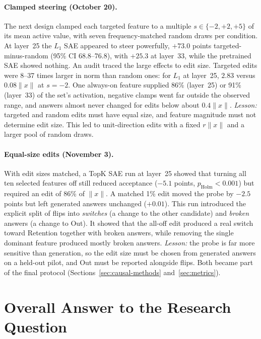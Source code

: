 \paragraph{Clamped steering (October 20).} The next design clamped each
targeted feature to a multiple $s\in\{-2,+2,+5\}$ of its mean active value,
with seven frequency-matched random draws per condition. At layer~25 the $L_1$
SAE appeared to steer powerfully, $+73.0$ points targeted-minus-random (95\%
CI 68.8--76.8), with $+25.3$ at layer~33, while the pretrained SAE showed
nothing. An audit traced the large effects to edit size. Targeted edits were
8--37 times larger in norm than random ones: for $L_1$ at layer~25, $2.83$
versus $0.08\lVert x\rVert$ at $s=-2$. One always-on feature supplied 86\%
(layer~25) or 91\% (layer~33) of the set's activation, negative clamps went
far outside the observed range, and answers almost never changed for edits
below about $0.4\lVert x\rVert$. \emph{Lesson:} targeted and random edits must
have equal size, and feature magnitude must not determine edit size. This led
to unit-direction edits with a fixed $r\lVert x\rVert$ and a larger pool of
random draws.

\paragraph{Equal-size edits (November 3).} With edit sizes matched, a TopK
SAE run at layer~25 showed that turning all ten selected features off still
reduced acceptance ($-5.1$ points, $p_{\mathrm{Holm}}<0.001$) but required an
edit of 86\% of $\lVert x\rVert$. A matched 1\% edit moved the probe by $-2.5$
points but left generated answers unchanged ($+0.01$). This run introduced
the explicit split of flips into \emph{switches} (a change to the other
candidate) and \emph{broken} answers (a change to Out). It showed that the
all-off edit produced a real switch toward Retention together with broken
answers, while removing the single dominant feature produced mostly broken
answers. \emph{Lesson:} the probe is far more sensitive than generation, so
the edit size must be chosen from generated answers on a held-out pilot, and
Out must be reported alongside flips. Both became part of the final protocol
(Sections~\ref{sec:causal-methods} and~\ref{sec:metrics}).

\section{Overall Answer to the Research Question}
\label{sec:res-overall}

